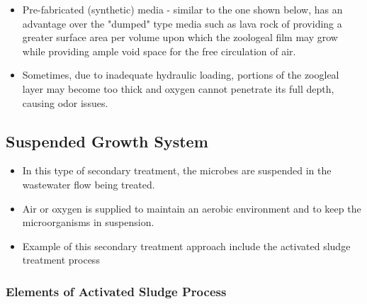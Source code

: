\begin{itemize}
\item Pre-fabricated (synthetic) media - similar to the one shown below, has an advantage over the "dumped" type media such as lava rock of providing a greater surface area per volume upon which the zoologeal film may grow while providing ample void space for the free circulation of air.

\item Sometimes, due to inadequate hydraulic loading, portions of the zoogleal layer may become too thick and oxygen cannot penetrate its full depth, causing odor issues.





\end{itemize}



\subsection{Suspended Growth System}
\begin{itemize}
\item In this type of secondary treatment, the microbes are suspended in the
wastewater flow being treated. 
\item Air or oxygen is supplied to maintain an aerobic environment and to keep the microorganisms in suspension. 
\item Example of this secondary treatment approach include the activated sludge treatment process 
\end{itemize}

\subsubsection{Elements of Activated Sludge Process}


